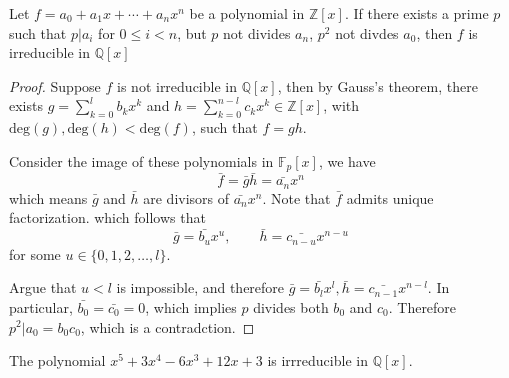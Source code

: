 \begin{theorem}
Let $f=a_0+a_1x+\cdots+a_nx^n$ be a polynomial in $\mathbb{Z}[x]$. If there exists a prime $p$ such that $p|a_i$ for $0\le i< n$, but $p$ not divides $a_n$, $p^2$ not divdes $a_0$, then $f$ is irreducible in $\mathbb{Q}[x]$
\end{theorem}
\begin{proof}
Suppose $f$ is not irreducible in $\mathbb{Q}[x]$, then by Gauss's theorem, there exists $g=\sum_{k=0}^lb_kx^k$ and $h=\sum_{k=0}^{n-l}c_kx^k\in\mathbb{Z}[x]$, with $\mbox{deg}(g),\mbox{deg}(h)<\mbox{deg}(f)$, such that $f=gh$.

Consider the image of these polynomials in $\mathbb{F}_p[x]$, we have
\[
\bar{f}=\bar g\bar h=\bar{a_n}x^n
\]
which means $\bar g$ and $\bar h$ are divisors of $\bar{a_n}x^n$. Note that $\bar f$ admits unique factorization. which follows that
\[
\bar g=\bar{b_u}x^u,
\qquad
\bar h=\bar{c_{n-u}}x^{n-u}
\]
for some $u\in\{0,1,2,\dots,l\}$. 

Argue that $u<l$ is impossible, and therefore $\bar g=\bar{b_l}x^l,\bar h=\bar{c_{n-1}}x^{n-l}$. In particular, $\bar{b_0}=\bar{c_0}=0$, which implies $p$ divides both $b_0$ and $c_0$. Therefore $p^2|a_0=b_0c_0$, which is a contradction.
\end{proof}
\begin{example}
The polynomial $x^5+3x^4-6x^3+12x+3$ is irrreducible in $\mathbb{Q}[x]$.
\end{example}


















